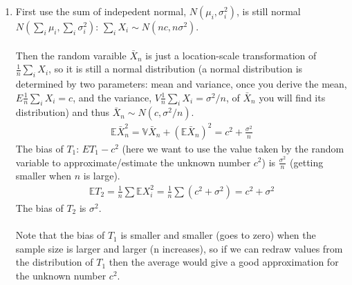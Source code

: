 \begin{exercise} [BH.6.12]
\begin{solution}
\begin{enumerate}
	\item First use the sum of indepedent normal, $N(\mu_i,\sigma_i^2)$,  is still normal $N(\sum_i\mu_i,\sum_i\sigma_i^2)$: $\sum_i X_i \sim N(n c, n\sigma^2)$.\\~\\ Then the random varaible $\bar{X}_n$ is just a location-scale transformation of $\frac{1}{n}\sum_i X_i$, so it is still a normal distribution (a normal distribution is determined by two parameters: mean and variance, once you derive the mean, $E\frac{1}{n}\sum_i X_i=c$, and the variance, $V\frac{1}{n}\sum_i X_i=\sigma^2/n$, of $\bar{X}_n$ you will find its distribution) and thus $\bar{X}_n\sim N(c, \sigma^2/n)$. 
	\begin{align*}
		\mathbb{E}\bar{X}_n^2 = 	\mathbb{V}\bar{X}_n + 	(\mathbb{E}\bar{X}_n)^2 = c^2 +\frac{\sigma^2}{n}
	\end{align*}
	The bias of $T_1$: $ET_1-c^2$ (here we want to use the value taken by the random variable to approximate/estimate the unknown number $c^2$)  is $\frac{\sigma^2}{n}$ (getting smaller when $n$ is large). 
	\begin{align*}
		\mathbb{E}T_2  = \frac{1}{n}	\sum \mathbb{E}{X}_i^2 = \frac{1}{n}\sum (c^2 +{\sigma^2}) =c^2 +{\sigma^2}
	\end{align*}
	The bias of $T_2$ is ${\sigma^2}$. \\~\\
	Note that the bias of $T_1$ is smaller and smaller (goes to zero) when the sample size is larger and larger (n increases), so if we can redraw values from the distribution of $T_1$ then the average would give a good approximation for the unknown number $c^2$.
	\end{enumerate}
\end{solution}
\end{exercise}

